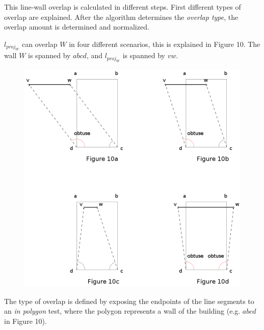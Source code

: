 \documentclass[10pt]{article}
\begin{document}
{	%
	This line-wall overlap is calculated in different steps.
	First different types of overlap are explained. After the algorithm
	determines the \emph{overlap type}, the overlap amount is determined and
	normalized.

	$l_{proj_W}$ can overlap $W$ in four different scenarios, this is explained
	in Figure 10. The wall $W$ is spanned by $abcd$, and $l_{proj_W}$ is spanned
	by $vw$.
	

	\begin{figure}[!ht]
	\centering
	\includegraphics[width=12cm]{img/overlaytypes.png}
	\end{figure}
		


	The type of overlap is defined by exposing the endpoints of the line
	segments to an \emph{in polygon} test, where the polygon represents a 
	wall of the building (e.g. $abcd$ in Figure 10).

}
\end{document}
